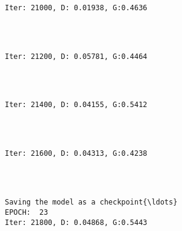 \documentclass[11pt]{article}
\begin{document}
    \begin{Verbatim}[commandchars=\\\{\}]

Iter: 21000, D: 0.01938, G:0.4636
    \end{Verbatim}

    \begin{center}
    \end{center}
    { \hspace*{\fill} \\}
    
    \begin{Verbatim}[commandchars=\\\{\}]

Iter: 21200, D: 0.05781, G:0.4464
    \end{Verbatim}

    \begin{center}
    \end{center}
    { \hspace*{\fill} \\}
    
    \begin{Verbatim}[commandchars=\\\{\}]

Iter: 21400, D: 0.04155, G:0.5412
    \end{Verbatim}

    \begin{center}
    \end{center}
    { \hspace*{\fill} \\}
    
    \begin{Verbatim}[commandchars=\\\{\}]

Iter: 21600, D: 0.04313, G:0.4238
    \end{Verbatim}

    \begin{center}
    \end{center}
    { \hspace*{\fill} \\}
    
    \begin{Verbatim}[commandchars=\\\{\}]

Saving the model as a checkpoint{\ldots}
EPOCH:  23
Iter: 21800, D: 0.04868, G:0.5443
    \end{Verbatim}
\end{document}
